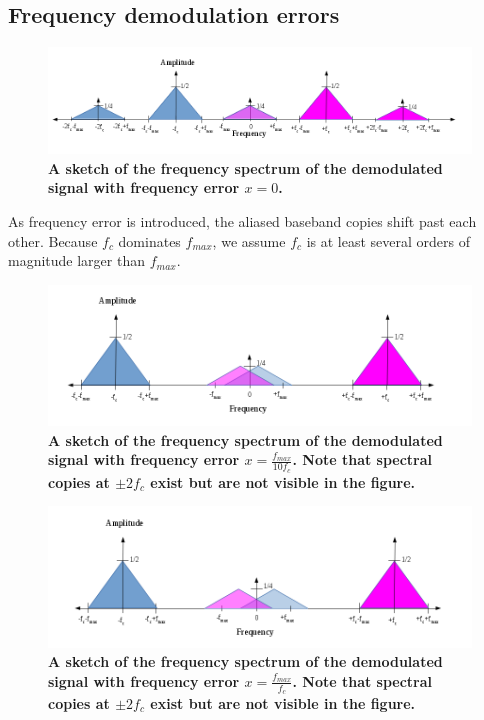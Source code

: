 \documentclass[letterpaper,12pt]{article}
\begin{document}
\subsection{Frequency demodulation errors}

\begin{figure}[hbtp]
\includegraphics[width=1.0\columnwidth]{prelab1-figure2a}
\caption{
\label{fig:prelab1-figure2a}
{\bf A sketch of the frequency spectrum of the demodulated signal with
frequency error $x=0$.
}
}
\end{figure}

As frequency error is introduced, the aliased baseband copies shift past each
other.  Because $f_{c}$ dominates $f_{max}$, we assume $f_{c}$ is at least
several orders of magnitude larger than $f_{max}$.

\begin{figure}[hbtp]
\includegraphics[width=1.0\columnwidth]{prelab1-figure2b}
\caption{
\label{fig:prelab1-figure2b}
{\bf A sketch of the frequency spectrum of the demodulated signal with
frequency error $x=\frac{f_{max}}{10f_{c}}$. Note that spectral copies at
$\pm2f_{c}$ exist but are not visible in the figure.
}
}
\end{figure}

\begin{figure}[hbtp]
\includegraphics[width=1.0\columnwidth]{prelab1-figure2c}
\caption{
\label{fig:prelab1-figure2c}
{\bf  A sketch of the frequency spectrum of the demodulated signal with
frequency error $x=\frac{f_{max}}{f_{c}}$.  Note that spectral copies at
$\pm2f_{c}$ exist but are not visible in the figure.
}
}
\end{figure}
\end{document}
